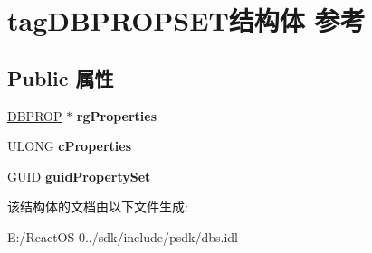 \hypertarget{structtag_d_b_p_r_o_p_s_e_t}{}\section{tag\+D\+B\+P\+R\+O\+P\+S\+E\+T结构体 参考}
\label{structtag_d_b_p_r_o_p_s_e_t}
\subsection*{Public 属性}
\begin{DoxyCompactItemize}
\item 
\mbox{\label{structtag_d_b_p_r_o_p_s_e_t_a02135e0dda6ec2f34aadaa24c6451631}} 
\hyperlink{structtag_d_b_p_r_o_p}{D\+B\+P\+R\+OP} $\ast$ {\bfseries rg\+Properties}
\item 
\mbox{\label{structtag_d_b_p_r_o_p_s_e_t_ad6e271d4cc5c2c2597fe9a5a22d0dcc7}} 
U\+L\+O\+NG {\bfseries c\+Properties}
\item 
\mbox{\label{structtag_d_b_p_r_o_p_s_e_t_a9418d0fd4d3986e3170a298ded115327}} 
\hyperlink{interface_g_u_i_d}{G\+U\+ID} {\bfseries guid\+Property\+Set}
\end{DoxyCompactItemize}


该结构体的文档由以下文件生成\+:\begin{DoxyCompactItemize}
\item 
E\+:/\+React\+O\+S-\/0../sdk/include/psdk/dbs.\+idl\end{DoxyCompactItemize}
